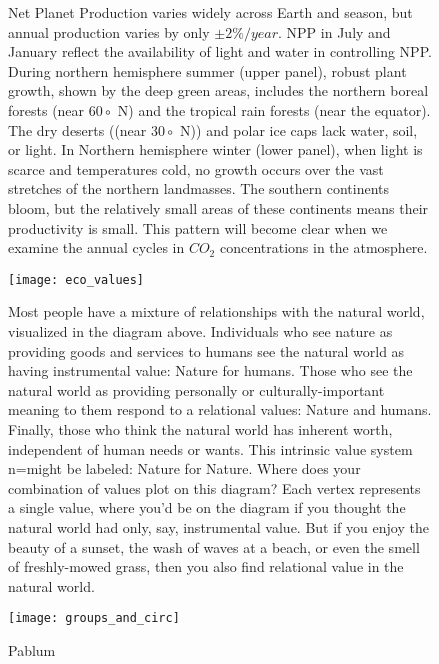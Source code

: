 \documentclass[amstex,12pt]{book}
\begin{document}
\newpage
\begin{figure}[p]
\centering
{}


\caption{Net Planet Production varies widely across Earth and season, but annual production varies by only $\pm 2\%/year$. NPP in July and January reflect the availability of light and water in controlling NPP. During northern hemisphere summer (upper panel), robust plant growth, shown by the deep green areas, includes the northern boreal forests (near $60\circ$ N) and the tropical rain forests (near the equator). The dry deserts ((near $30\circ$ N)) and polar ice caps lack water, soil, or light. In Northern hemisphere winter (lower panel), when light is scarce and temperatures cold, no growth occurs over the vast stretches of the northern landmasses. The southern continents bloom, but the relatively small areas of these continents means their productivity is small. This pattern will become clear when we examine the annual cycles in $CO_2$ concentrations in the atmosphere.  }

\label{fig:npp}
\end{figure}

\newpage
\begin{figure}[p]
\centering
  \texttt{[image: eco\_values]}%


\caption{Most people have a mixture of relationships with the natural world, visualized in the diagram above. Individuals who see nature as providing goods and services to humans see the natural world as having instrumental value: Nature for humans. Those who see the natural world as providing personally or culturally-important meaning to them respond to a relational values: Nature and humans. Finally, those who think the natural world has inherent worth, independent of human needs or wants. This intrinsic value system n=might be labeled: Nature for Nature. Where does your combination of values plot on this diagram? Each vertex represents a single value, where you'd be on the diagram if you thought the natural world had only, say, instrumental value. But if you enjoy the beauty of a sunset, the wash of waves at a beach, or even the smell of freshly-mowed grass, then you also find relational value in the natural world. }
\label{fig:eco_values}
\end{figure}



\newpage
\begin{figure}[p]
\centering
  \texttt{[image: groups\_and\_circ]}%

\caption{Pablum}
\label{fig:groups_and_circ}
\end{figure}
\end{document}
